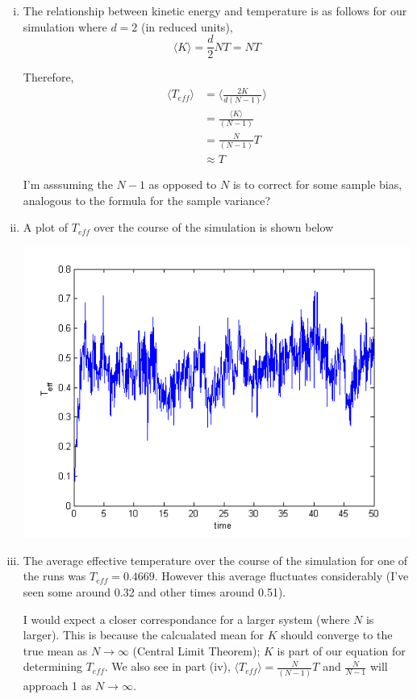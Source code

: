 \documentclass{article}
\begin{document}
\begin{enumerate}[i.]
  \item The relationship between kinetic energy and temperature is as follows for our simulation where $d=2$ (in reduced units),
    $$\langle K \rangle = \frac{d}{2}NT = NT$$

    Therefore,
    \begin{align*}
      \langle T_{eff} \rangle &= \langle \frac{2K}{d(N-1)} \rangle \\
      &= \frac{\langle K \rangle}{(N-1)} \\
      &= \frac{N}{(N-1)} T\\
      &\approx T
    \end{align*}

    I'm asssuming the $N-1$ as opposed to $N$ is to correct for some sample bias, analogous to the formula for the sample variance?

  \item A plot of $T_{eff}$ over the course of the simulation is shown below
    \begin{center}
      \includegraphics[scale=0.5]{2v}
    \end{center}

  \item The average effective temperature over the course of the simulation for one of the runs was $T_{eff}=0.4669$. However this average fluctuates considerably (I've seen some around 0.32 and other times around 0.51). 

    I would expect a closer correspondance for a larger system (where $N$ is larger). This is because the calcualated mean for $K$ should converge to the true mean as $N\rightarrow \infty$ (Central Limit Theorem); $K$ is part of our equation for determining $T_{eff}$. We also see in part (iv), $\langle T_{eff} \rangle = \frac{N}{(N-1)} T$ and $\frac{N}{N-1}$ will approach 1 as $N\rightarrow \infty$. 
\end{enumerate}
\end{document}

